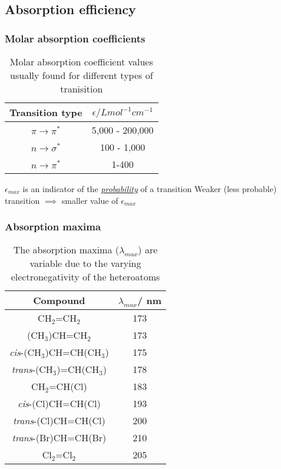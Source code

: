 \documentclass[a4paper,12pt,titlepage]{article}
\begin{document}
\subsection{Absorption efficiency}

\begin{frame}[label=molabs]
\frametitle{Molar absorption coefficients}
\begin{table}[h!]
\caption{Molar absorption coefficient values usually found for different types of tranisition}
\begin{tabular}{c c}
	\textbf{Transition type} & \textbf{\(\epsilon/L mol^{-1}cm^{-1}\)}\\\hline
	\(\pi \rightarrow \pi^*\) & 5,000 - 200,000\\
	\(n \rightarrow \sigma^*\) & 100 - 1,000\\
	\(n \rightarrow \pi^*\) & 1-400\\\hline
\end{tabular}
\end{table}
\textbullet \(\epsilon_{max}\) is an indicator of the \emph{\underline{probability}} of a transition\newline\bigskip
\textbullet Weaker (less probable) transition \(\implies\) smaller value of \(\epsilon_{max}\)
\hyperlink{spontaneous<7>}{}
\end{frame}

\begin{frame}
\frametitle{Absorption maxima}
\begin{table}[h!]
\caption{The absorption maxima (\(\lambda_{max}\)) are variable due to the varying electronegativity of the heteroatoms}
\begin{tabular}{c c}
\textbf{Compound} 		&	\textbf{\(\lambda_{max}\)/ nm}\\\hline\rule{0pt}{1.2em}
CH\(_2\)=CH\(_2\)		&	173\\
(CH\(_3\))CH=CH\(_2\)	&	173\\
\textit{cis}-(CH\(_3\))CH=CH(CH\(_3\))	&	175\\
\textit{trans}-(CH\(_3\))=CH(CH\(_3\))	&	178\\
CH\(_2\)=CH(Cl)	&	183\\
\textit{cis}-(Cl)CH=CH(Cl)	&	193\\
\textit{trans}-(Cl)CH=CH(Cl)	&	200\\
\textit{trans}-(Br)CH=CH(Br)	&	210\\
Cl\(_2\)=Cl\(_2\)	&	205\\\hline
\end{tabular}
\end{table}
\end{frame}
\end{document}
